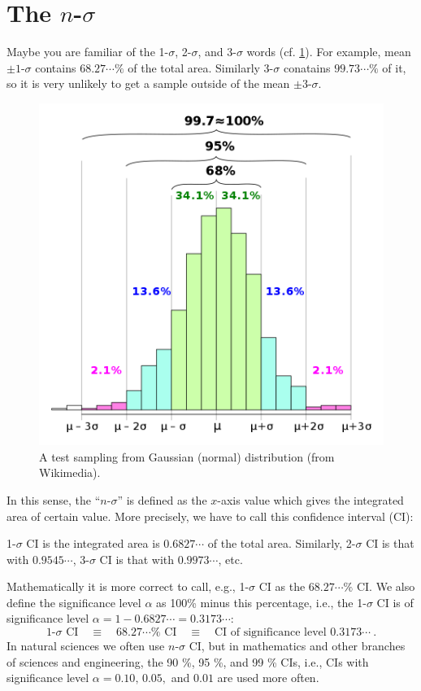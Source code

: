 \section{The $ n $-$ \sigma $} \label{sec: n-sigma notation}
Maybe you are familiar of the 1-$ \sigma $, 2-$ \sigma $, and 3-$ \sigma $ words (cf. \cref{fig:nsigmawiki}). For example, mean $ \pm 1$-$ \sigma $ contains $ 68.27\cdots \% $ of the total area. Similarly 3-$ \sigma $ conatains $ 99.73\cdots \% $ of it, so it is very unlikely to get a sample outside of the mean $ \pm 3 $-$ \sigma $. 

\begin{figure}[ht!]
  \centering
  \includegraphics[width=0.5\linewidth]{figs/nsigma_wiki}
  \caption{A test sampling from Gaussian (normal) distribution (from Wikimedia).}
  \label{fig:nsigmawiki}
\end{figure}

In this sense, the ``$ n $-$ \sigma $'' is defined as the $ x $-axis value which gives the integrated area of certain value. More precisely, we have to call this confidence interval (CI):

\begin{defn}
  1-$ \sigma $ CI is the integrated area is $ 0.6827\cdots $ of the total area. Similarly, 2-$ \sigma $ CI is that with $ 0.9545\cdots $, 3-$ \sigma $ CI is that with $ 0.9973\cdots $, etc. 
\end{defn}

Mathematically it is more correct to call, e.g., 1-$ \sigma $ CI as the $ 68.27\cdots \% $ CI. We also define the significance level $ \alpha $ as 100\% minus this percentage, i.e., the 1-$ \sigma $ CI is of significance level $ \alpha = 1 - 0.6827\cdots = 0.3173\cdots $:
\begin{equation}
  \text{1-}\sigma \text{ CI}
  \quad \equiv \quad 
  68.27\cdots \% \text{ CI}
  \quad \equiv \quad 
  \text{CI of significance level } 0.3173 \cdots ~.
\end{equation}
In natural sciences we often use $ n $-$ \sigma $ CI, but in mathematics and other branches of sciences and engineering, the 90 \%, 95 \%, and 99 \% CIs, i.e., CIs with significance level $ \alpha = 0.10,\, 0.05,$ and $ 0.01 $ are used more often.

